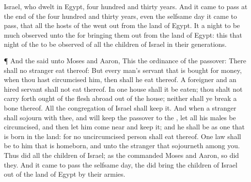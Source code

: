 {Israel, who
dwelt in
Egypt,
{}
four
hundred and
thirty
years.
And it came to pass at the
end of the
four
hundred and
thirty
years, even the
selfsame
day it came to pass, that all the
hosts of the
{} went
out from the
land of
Egypt.
It
{} a
night to be much
observed unto the
{} for
bringing them out from the
land of
Egypt: this
{} that
night of the
{} to be
observed of all the
children of
Israel in their
generations.
\par }{\PP {}¶ And the
{}
said unto
Moses and
Aaron, This
{} the
ordinance of the
passover: There shall no
stranger
eat thereof:
But every
man’s
servant that is
bought for
money, when thou hast
circumcised him, then shall he
eat thereof.
A
foreigner and an hired
servant shall not
eat thereof.
In
one
house shall it be
eaten; thou shalt not carry
forth ought of the
flesh
abroad out of the
house; neither shall ye
break a
bone thereof.
All the
congregation of
Israel shall
keep it.
And when a
stranger shall
sojourn with thee, and will
keep the
passover to the
{}, let all his
males be
circumcised, and then let him come
near and
keep it; and he shall be as one that is
born in the
land: for no uncircumcised
person shall
eat thereof.
One
law shall be to him that is
homeborn, and unto the
stranger that
sojourneth
among you.
Thus
did all the
children of
Israel; as the
{}
commanded
Moses and
Aaron, so
did they.
And it came to pass the
selfsame
day,
{} the
{} did
bring the
children of
Israel out of the
land of
Egypt by their
armies.

}
